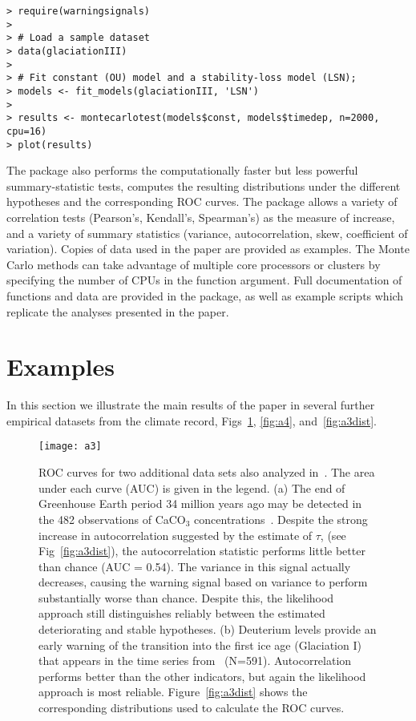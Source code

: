 \documentclass[authoryear, preprint,review,12pt]{elsarticle}
\begin{document}
\begin{verbatim}
> require(warningsignals)
>
> # Load a sample dataset
> data(glaciationIII)
>
> # Fit constant (OU) model and a stability-loss model (LSN);
> models <- fit_models(glaciationIII, 'LSN')
>
> results <- montecarlotest(models$const, models$timedep, n=2000, cpu=16)
> plot(results)
\end{verbatim}

The package also performs the computationally faster but less powerful summary-statistic tests, computes the resulting distributions under the different hypotheses and the corresponding ROC curves.  The package allows a variety of correlation tests (Pearson's, Kendall's, Spearman's) as the measure of increase, and a variety of summary statistics (variance, autocorrelation, skew, coefficient of variation).  Copies of data used in the paper are provided as examples.  The Monte Carlo methods can take advantage of multiple core processors or clusters by specifying the number of CPUs in the function argument.   Full documentation of functions and data are provided in the package, as well as example scripts which replicate the analyses presented in the paper.   

\section{Examples}\label{examples}
In this section we illustrate the main results of the paper in several further empirical datasets from the climate record, Figs~\ref{fig:a3}, \ref{fig:a4}, and~\ref{fig:a3dist}.  

\begin{figure}[ht]
  \begin{center}
    \texttt{[image: a3]}
  \end{center}
  \caption{ROC curves for two additional data sets also analyzed in~\citet{Dakos2008}.  The area under each curve (AUC) is given in the legend. (a) The end of Greenhouse Earth period 34 million years ago may be detected in the 482 observations of CaCO$_3$ concentrations~\citep{Tripati2005}.   Despite the strong increase in autocorrelation suggested by the estimate of $\tau$, (see Fig~\ref{fig:a3dist}), the autocorrelation statistic performs little better than chance (AUC = 0.54). The variance in this signal actually decreases, causing the warning signal based on variance to perform substantially worse than chance.  Despite this, the likelihood approach still distinguishes reliably between the estimated deteriorating and stable hypotheses.  (b) Deuterium levels provide an early warning of the transition into the first ice age (Glaciation I) that appears in the time series from~\citep{Petit1999} (N=591).  Autocorrelation performs better than the other indicators, but again the likelihood approach is most reliable.  Figure~\ref{fig:a3dist} shows the corresponding distributions used to calculate the ROC curves.}
  \label{fig:a3}
\end{figure}
\end{document}
